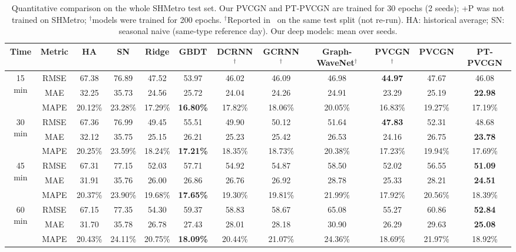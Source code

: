 \begin{table}[t]
\centering
\caption{Quantitative comparison on the whole SHMetro test set. Our PVCGN and PT-PVCGN are trained for 30 epochs (2 seeds); +P was not trained on SHMetro; $^\dagger$models were trained for 200 epochs. $^\dagger$Reported in~\cite{liu2022pvcgn} on the same test split (not re-run). HA: historical average; SN: seasonal naive (same-type reference day). Our deep models: mean over seeds.}
\label{tab:sh-whole}
\scriptsize
\setlength{\tabcolsep}{3.2pt}
\begin{tabular}{cc|cccc|cccc|cc}
\toprule
Time & Metric & HA & SN & Ridge & GBDT & DCRNN$^\dagger$ & GCRNN$^\dagger$ & Graph-WaveNet$^\dagger$ & PVCGN$^\dagger$ & PVCGN & PT-PVCGN \\
\midrule
\multirow{3}{*}{15 min} & RMSE & 67.38 & 76.89 & 47.52 & 53.97 & 46.02 & 46.09 & 46.98 & \textbf{44.97} & 47.67 & 46.08 \\
 & MAE & 32.25 & 35.73 & 24.56 & 25.72 & 24.04 & 24.26 & 24.91 & 23.29 & 25.19 & \textbf{22.98} \\
 & MAPE & 20.12\% & 23.28\% & 17.29\% & \textbf{16.80\%} & 17.82\% & 18.06\% & 20.05\% & 16.83\% & 19.27\% & 17.19\% \\
\midrule
\multirow{3}{*}{30 min} & RMSE & 67.36 & 76.99 & 49.45 & 55.51 & 49.90 & 50.12 & 51.64 & \textbf{47.83} & 52.31 & 48.68 \\
 & MAE & 32.12 & 35.75 & 25.15 & 26.21 & 25.23 & 25.42 & 26.53 & 24.16 & 26.75 & \textbf{23.78} \\
 & MAPE & 20.25\% & 23.59\% & 18.24\% & \textbf{17.21\%} & 18.35\% & 18.73\% & 20.38\% & 17.23\% & 19.94\% & 17.69\% \\
\midrule
\multirow{3}{*}{45 min} & RMSE & 67.31 & 77.15 & 52.03 & 57.71 & 54.92 & 54.87 & 58.50 & 52.02 & 56.55 & \textbf{51.09} \\
 & MAE & 31.91 & 35.76 & 26.00 & 26.86 & 26.76 & 26.92 & 28.78 & 25.33 & 28.21 & \textbf{24.51} \\
 & MAPE & 20.37\% & 23.90\% & 19.68\% & \textbf{17.65\%} & 19.30\% & 19.81\% & 21.99\% & 17.92\% & 20.56\% & 18.39\% \\
\midrule
\multirow{3}{*}{60 min} & RMSE & 67.15 & 77.35 & 54.30 & 59.37 & 58.83 & 58.67 & 65.08 & 55.27 & 60.86 & \textbf{52.84} \\
 & MAE & 31.70 & 35.78 & 26.78 & 27.43 & 28.01 & 28.18 & 30.90 & 26.29 & 29.63 & \textbf{25.08} \\
 & MAPE & 20.43\% & 24.11\% & 20.75\% & \textbf{18.09\%} & 20.44\% & 21.07\% & 24.36\% & 18.69\% & 21.97\% & 18.92\% \\
\bottomrule
\end{tabular}
\end{table}